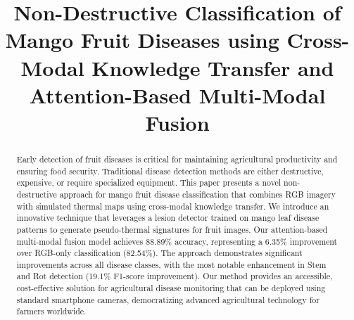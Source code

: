 \documentclass[conference]{IEEEtran}
\begin{document}
\title{Non-Destructive Classification of Mango Fruit Diseases using Cross-Modal Knowledge Transfer and Attention-Based Multi-Modal Fusion}

\author{
\and
{}
\and
{}
}

\maketitle

\begin{abstract}
Early detection of fruit diseases is critical for maintaining agricultural productivity and ensuring food security. Traditional disease detection methods are either destructive, expensive, or require specialized equipment. This paper presents a novel non-destructive approach for mango fruit disease classification that combines RGB imagery with simulated thermal maps using cross-modal knowledge transfer. We introduce an innovative technique that leverages a lesion detector trained on mango leaf disease patterns to generate pseudo-thermal signatures for fruit images. Our attention-based multi-modal fusion model achieves 88.89\% accuracy, representing a 6.35\% improvement over RGB-only classification (82.54\%). The approach demonstrates significant improvements across all disease classes, with the most notable enhancement in Stem and Rot detection (19.1\% F1-score improvement). Our method provides an accessible, cost-effective solution for agricultural disease monitoring that can be deployed using standard smartphone cameras, democratizing advanced agricultural technology for farmers worldwide.
\end{abstract}
\end{document}
